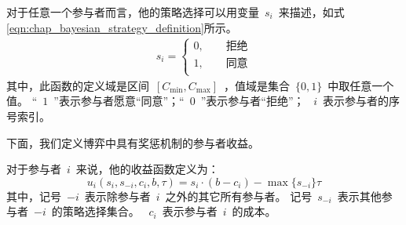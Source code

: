 对于任意一个参与者而言，他的策略选择可以用变量~$s_i$~来描述，如式\ref{eqn:chap_bayesian_strategy_definition}所示。
\begin{align}
    s_i = \begin{cases}
        0, \qquad\text{拒绝}\\
        1, \qquad\text{同意}\\
    \end{cases}
    \label{eqn:chap_bayesian_strategy_definition}
\end{align}
其中，此函数的定义域是区间~$[C_{\min}, C_{\max}]$~，值域是集合~$\{0,1\}$~中取任意一个值。
“~$1$~”表示参与者愿意“同意”；“~$0$~”表示参与者“拒绝”；
~$i$~表示参与者的序号索引。

下面，我们定义博弈中具有奖惩机制的参与者收益。

对于参与者~$i$~来说，他的收益函数定义为：
\begin{equation}
 u_i(s_i, s_{-i}, c_i, b, \tau) = s_i\cdot (b - c_i) - \max\{s_{-i}\} \tau
\label{eqn:chap_bayesian_player_payoff}     
\end{equation}
其中，记号~$-i$~表示除参与者~$i$~之外的其它所有参与者。
记号~$s_{-i}$~表示其他参与者~$-i$~的策略选择集合。
~$c_i$~表示参与者~$i$~的成本。
%

